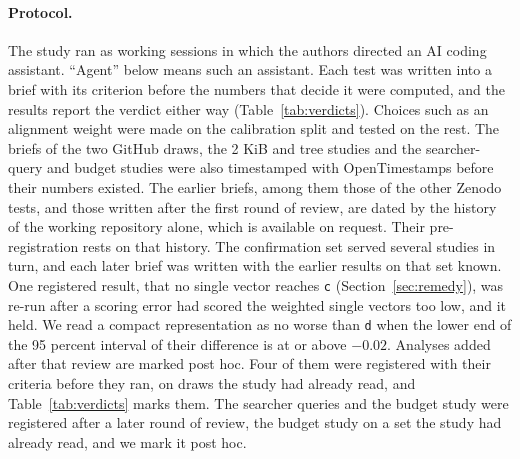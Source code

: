 \documentclass[sigconf,natbib=true,anonymous=true]{acmart}
\newcommand{\rep}[1]{\texttt{#1}}
\begin{document}
\paragraph{Protocol.} The study ran as working sessions in which the authors directed an AI coding assistant. ``Agent'' below means such an assistant. Each test was written into a brief with its criterion before the numbers that decide it were computed, and the results report the verdict either way (Table~\ref{tab:verdicts}). Choices such as an alignment weight were made on the calibration split and tested on the rest. The briefs of the two GitHub draws, the 2 KiB and tree studies and the searcher-query and budget studies were also timestamped with OpenTimestamps \citep{todd2016opentimestamps} before their numbers existed. The earlier briefs, among them those of the other Zenodo tests, and those written after the first round of review, are dated by the history of the working repository alone, which is available on request. Their pre-registration rests on that history. The confirmation set served several studies in turn, and each later brief was written with the earlier results on that set known. One registered result, that no single vector reaches \rep{c} (Section~\ref{sec:remedy}), was re-run after a scoring error had scored the weighted single vectors too low, and it held. We read a compact representation as no worse than \rep{d} when the lower end of the 95 percent interval of their difference is at or above $-0.02$. Analyses added after that review are marked post hoc. Four of them were registered with their criteria before they ran, on draws the study had already read, and Table~\ref{tab:verdicts} marks them. The searcher queries and the budget study were registered after a later round of review, the budget study on a set the study had already read, and we mark it post hoc.
\end{document}
